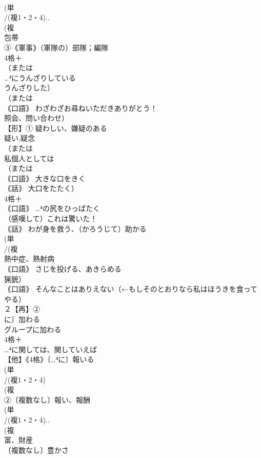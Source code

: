 \documentclass[8pt]{extreport}
\begin{document}
\begin{CJK}{UTF8}{min}
\\	(単
\\	/(複1・2・4)..
\\	(複
\\	包帯 
\\	③｟軍事｠（軍隊の）部隊；編隊
\\	4格＋
\\	（または
\\	…⁴にうんざりしている 
\\	うんざりした）
\\	（または
\\	｟口語｠ わざわざお尋ねいただきありがとう！ 
\\	照会、問い合わせ）
\\	【形】① 疑わしい、嫌疑のある 
\\	疑い,疑念
\\	（または
\\	私個人としては
\\	（または
\\	｟口語｠ 大きな口をきく 
\\	｟話｠ 大口をたたく）
\\	4格＋
\\	｟口語｠ …⁴の尻をひっぱたく
\\	（感嘆して）これは驚いた！
\\	｟話｠ わが身を救う、（かろうじて）助かる
\\	(単
\\	/(複
\\	熱中症、熱射病 
\\	｟口語｠ さじを投げる、あきらめる　
\\	猟銃）
\\	｟口語｠ そんなことはありえない（←もしそのとおりなら私はほうきを食ってやる）
\\	２【再】②
\\	に〕加わる 
\\	グループに加わる 
\\	4格＋
\\	…⁴に関しては、関していえば
\\	【他】《4格》〔…⁴に〕報いる 
\\	(単
\\	/(複1・2・4)
\\	(複
\\	②〔複数なし〕報い、報酬 
\\	(単
\\	/(複1・2・4)..
\\	(複
\\	富、財産 
\\	〔複数なし〕豊かさ

\end{CJK}
\end{document}
